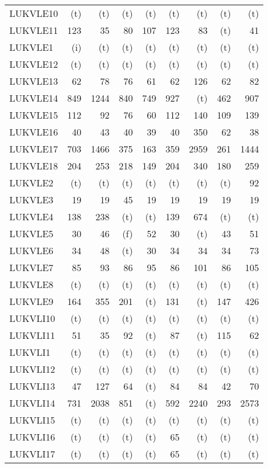 \documentclass[11pt,twoside]{article}
\begin{document}
{\begin{longtable}[c]{|l|r|r|r|r|r|r|r|r|}
 LUKVLE10 & (t) & (t) & (t) & (t) & (t) & (t) & (t) & (t) \\
 LUKVLE11 & 123 & 35 & 80 & 107 & 123 & 83 & (t) & 41 \\
 LUKVLE1 & (i) & (t) & (t) & (t) & (t) & (t) & (t) & (t) \\
 LUKVLE12 & (t) & (t) & (t) & (t) & (t) & (t) & (t) & (t) \\
 LUKVLE13 & 62 & 78 & 76 & 61 & 62 & 126 & 62 & 82 \\
 LUKVLE14 & 849 & 1244 & 840 & 749 & 927 & (t) & 462 & 907 \\
 LUKVLE15 & 112 & 92 & 76 & 60 & 112 & 140 & 109 & 139 \\
 LUKVLE16 & 40 & 43 & 40 & 39 & 40 & 350 & 62 & 38 \\
 LUKVLE17 & 703 & 1466 & 375 & 163 & 359 & 2959 & 261 & 1444 \\
 LUKVLE18 & 204 & 253 & 218 & 149 & 204 & 340 & 180 & 259 \\
 LUKVLE2 & (t) & (t) & (t) & (t) & (t) & (t) & (t) & 92 \\
 LUKVLE3 & 19 & 19 & 45 & 19 & 19 & 19 & 19 & 19 \\
 LUKVLE4 & 138 & 238 & (t) & (t) & 139 & 674 & (t) & (t) \\
 LUKVLE5 & 30 & 46 & (f) & 52 & 30 & (t) & 43 & 51 \\
 LUKVLE6 & 34 & 48 & (t) & 30 & 34 & 34 & 34 & 73 \\
 LUKVLE7 & 85 & 93 & 86 & 95 & 86 & 101 & 86 & 105 \\
 LUKVLE8 & (t) & (t) & (t) & (t) & (t) & (t) & (t) & (t) \\
 LUKVLE9 & 164 & 355 & 201 & (t) & 131 & (t) & 147 & 426 \\
 LUKVLI10 & (t) & (t) & (t) & (t) & (t) & (t) & (t) & (t) \\
 LUKVLI11 & 51 & 35 & 92 & (t) & 87 & (t) & 115 & 62 \\
 LUKVLI1 & (t) & (t) & (t) & (t) & (t) & (t) & (t) & (t) \\
 LUKVLI12 & (t) & (t) & (t) & (t) & (t) & (t) & (t) & (t) \\
 LUKVLI13 & 47 & 127 & 64 & (t) & 84 & 84 & 42 & 70 \\
 LUKVLI14 & 731 & 2038 & 851 & (t) & 592 & 2240 & 293 & 2573 \\
 LUKVLI15 & (t) & (t) & (t) & (t) & (t) & (t) & (t) & (t) \\
 LUKVLI16 & (t) & (t) & (t) & (t) & 65 & (t) & (t) & (t) \\
 LUKVLI17 & (t) & (t) & (t) & (t) & 65 & (t) & (t) & (t) \\

\end{longtable}}
\end{document}
